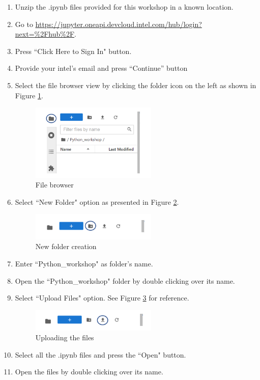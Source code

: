 \documentclass{assignment}
\begin{document}
\begin{enumerate}
    \item Unzip the .ipynb files provided for this workshop in a known location. 
    \item Go to \href{https://jupyter.oneapi.devcloud.intel.com/hub/login?next=%2Fhub%2F}{https://jupyter.oneapi.devcloud.intel.com/hub/login?next=\%2Fhub\%2F}.
    \item Press ``Click Here to Sign In" button.
    \item Provide your intel’s email and press “Continue” button 
    \item { 
        Select the file browser view by clicking the folder icon on the left as shown in Figure \ref{fig:import_0}.
        \begin{figure}[h]
         \centering 
            \includegraphics[width=6cm]{assets/intel_devcloud_login.png}
            \caption{File browser}
            \label{fig:import_0}
        \end{figure}
    }

    \item {
        Select ``New Folder" option as presented in Figure \ref{fig:import_1}.
        \begin{figure}[h]
         \centering 
            \includegraphics[width=6cm]{assets/intel_devcloud_new_folder.png}
            \caption{New folder creation}
            \label{fig:import_1}
        \end{figure}
    }
    \item Enter ``Python\_workshop" as folder’s name.
    \item Open the ``Python\_workshop" folder by double clicking over its name.
    \item {
        Select ``Upload Files" option. See Figure \ref{fig:import_2} for reference.
        \begin{figure}[h]
         \centering 
            \includegraphics[width=6cm]{assets/intel_devcloud_upload.png}
            \caption{Uploading the files}
            \label{fig:import_2}
        \end{figure}        
    }
    \item Select all the .ipynb files and press the ``Open" button.
    \item Open the files by double clicking over its name.
\end{enumerate}
\end{document}
